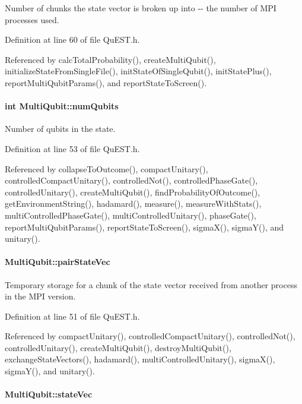 Number of chunks the state vector is broken up into -\/-\/ the number of MPI processes used. 

Definition at line 60 of file QuEST.h.

Referenced by calcTotalProbability(), createMultiQubit(), initializeStateFromSingleFile(), initStateOfSingleQubit(), initStatePlus(), reportMultiQubitParams(), and reportStateToScreen().\hypertarget{structMultiQubit_ab5b9795bdc6fb5855e1974dcbbaeb36f}{
\paragraph[{numQubits}]{\setlength{\rightskip}{0pt plus 5cm}int {\bf MultiQubit::numQubits}}\hfill}
\label{structMultiQubit_ab5b9795bdc6fb5855e1974dcbbaeb36f}


Number of qubits in the state. 

Definition at line 53 of file QuEST.h.

Referenced by collapseToOutcome(), compactUnitary(), controlledCompactUnitary(), controlledNot(), controlledPhaseGate(), controlledUnitary(), createMultiQubit(), findProbabilityOfOutcome(), getEnvironmentString(), hadamard(), measure(), measureWithStats(), multiControlledPhaseGate(), multiControlledUnitary(), phaseGate(), reportMultiQubitParams(), reportStateToScreen(), sigmaX(), sigmaY(), and unitary().\hypertarget{structMultiQubit_a76f7db4eab52d2b30f58f973ada809c5}{
\paragraph[{pairStateVec}]{ {\bf MultiQubit::pairStateVec}}\hfill}
\label{structMultiQubit_a76f7db4eab52d2b30f58f973ada809c5}


Temporary storage for a chunk of the state vector received from another process in the MPI version. 

Definition at line 51 of file QuEST.h.

Referenced by compactUnitary(), controlledCompactUnitary(), controlledNot(), controlledUnitary(), createMultiQubit(), destroyMultiQubit(), exchangeStateVectors(), hadamard(), multiControlledUnitary(), sigmaX(), sigmaY(), and unitary().\hypertarget{structMultiQubit_a45483190d6b01ef6b2f98f2bec9ab94f}{
\paragraph[{stateVec}]{ {\bf MultiQubit::stateVec}}\hfill}
\label{structMultiQubit_a45483190d6b01ef6b2f98f2bec9ab94f}


